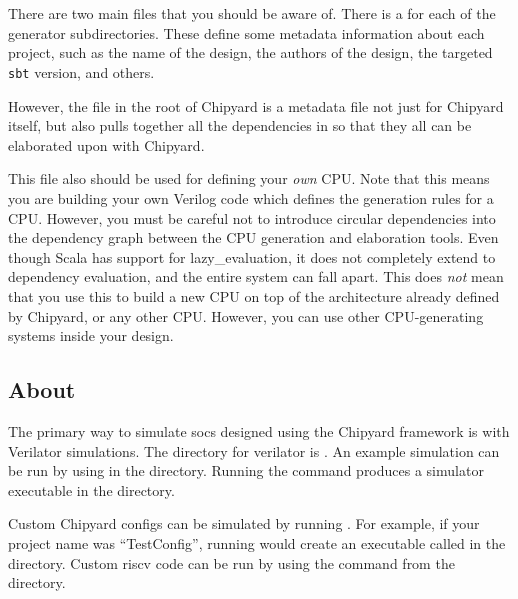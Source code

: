 \section{}\label{sec:build.sbt}
There are two main  files that you should be aware of.
There is a  for each of the generator subdirectories.
These define some metadata information about each project, such as the name of the design, the authors of the design, the targeted \texttt{sbt} version, and others.

However, the  file in the root of Chipyard is a metadata file not just for Chipyard itself, but also pulls together all the dependencies in  so that they all can be elaborated upon with Chipyard.

This file also should be used for defining your \emph{own} CPU.\@
Note that this means you are building your own Verilog code which defines the generation rules for a CPU.\@
However, you must be careful not to introduce circular dependencies into the dependency graph between the CPU generation and elaboration tools.
Even though Scala has support for \gls{lazy_evaluation}, it does not completely extend to dependency evaluation, and the entire system can fall apart.
This does \emph{not} mean that you use this to build a new CPU on top of the architecture already defined by Chipyard, or any other CPU.\@
However, you can use other CPU-generating systems inside your design.

\subsection{About}\label{sec:About_Verilator_Simulator}
The primary way to simulate \Glspl{soc} designed using the Chipyard framework is with Verilator simulations.
The directory for verilator is .
An example simulation can be run by using  in the  directory.
Running the  command produces a simulator executable in the  directory.

Custom Chipyard configs can be simulated by running .
For example, if your project name was ``TestConfig'', running  would create an executable called  in the  directory.
Custom \Gls{riscv} code can be run by using the command  from the  directory.

